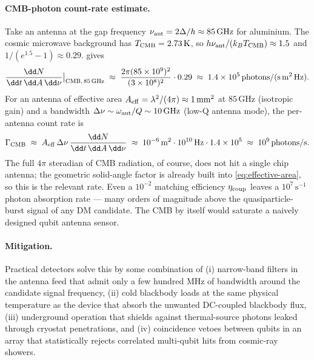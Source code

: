 \paragraph{CMB-photon count-rate estimate.}
Take an antenna at the gap frequency
$\nu_{\rm ant}=2\Delta/h\approx 85\,\text{GHz}$ for aluminium.
The cosmic microwave background has $T_{\rm CMB}=2.73\,\text{K}$,
so $h\nu_{\rm ant}/(k_B T_{\rm CMB})\approx 1.5$ and
$1/(e^{1.5}-1)\approx 0.29$.  gives
\begin{equation}
\frac{\dd N}{\dd t\,\dd A\,\dd\nu}\big|_{\rm CMB,\,85\,\text{GHz}}
\;\approx\; \frac{2\pi (85\times 10^9)^2}{(3\times 10^8)^2}\cdot 0.29
\;\approx\; 1.4\times 10^{5}\,\text{photons}/(\text{s}\,\text{m}^2\,\text{Hz}).
\end{equation}
For an antenna of effective area $A_{\rm eff}=\lambda^2/(4\pi)
\approx 1\,\text{mm}^2$ at $85\,\text{GHz}$ (isotropic gain) and
a bandwidth $\Delta\nu\sim\omega_{\rm ant}/Q\sim 10\,\text{GHz}$
(low-Q antenna mode), the per-antenna count rate is
\begin{equation}
\Gamma_{\rm CMB} \;\approx\; A_{\rm eff}\,\Delta\nu\,
\frac{\dd N}{\dd t\,\dd A\,\dd\nu}
\;\approx\; 10^{-6}\,\text{m}^2 \cdot 10^{10}\,\text{Hz}\cdot 1.4\times 10^{5}
\;\approx\; 10^{9}\,\text{photons}/\text{s}.
\end{equation}
The full $4\pi$ steradian of CMB radiation, of course, does not
hit a single chip antenna; the geometric solid-angle factor is
already built into \cref{eq:effective-area}, so this is the
relevant rate. Even a $10^{-2}$ matching efficiency
$\eta_{\rm coup}$ leaves a $10^{7}\,\text{s}^{-1}$ photon
absorption rate --- many orders of magnitude above the
quasiparticle-burst signal of any DM candidate. The CMB by itself
would saturate a naively designed qubit antenna sensor.

\paragraph{Mitigation.}
Practical detectors solve this by some combination of (i)
narrow-band filters in the antenna feed that admit only a few
hundred MHz of bandwidth around the candidate signal frequency,
(ii) cold blackbody loads at the same physical temperature as the
device that absorb the unwanted DC-coupled blackbody flux, (iii)
underground operation that shields against thermal-source
photons leaked through cryostat penetrations, and (iv) coincidence
vetoes between qubits in an array that statistically rejects
correlated multi-qubit hits from cosmic-ray showers.

